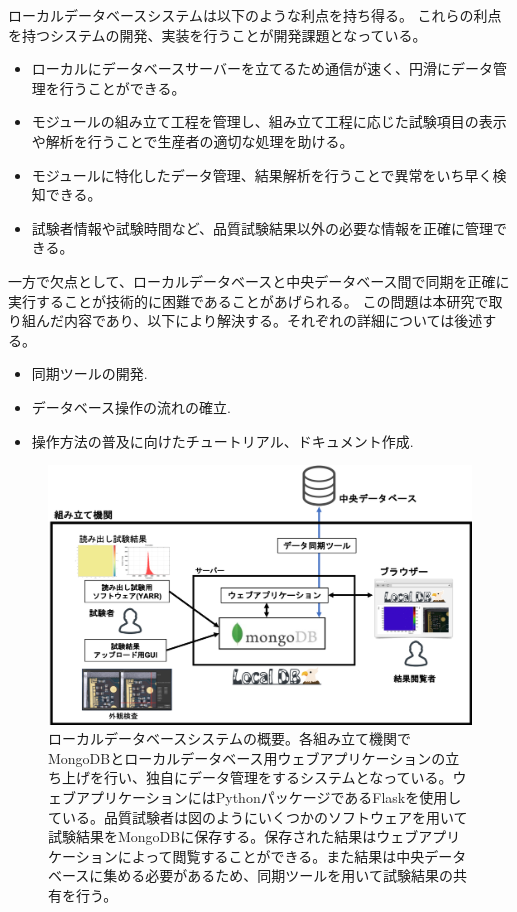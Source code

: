 ローカルデータベースシステムは以下のような利点を持ち得る。
これらの利点を持つシステムの開発、実装を行うことが開発課題となっている。

\begin{itemize}
  \item ローカルにデータベースサーバーを立てるため通信が速く、円滑にデータ管理を行うことができる。
  \item モジュールの組み立て工程を管理し、組み立て工程に応じた試験項目の表示や解析を行うことで生産者の適切な処理を助ける。
  \item モジュールに特化したデータ管理、結果解析を行うことで異常をいち早く検知できる。
  \item 試験者情報や試験時間など、品質試験結果以外の必要な情報を正確に管理できる。
\end{itemize}

一方で欠点として、ローカルデータベースと中央データベース間で同期を正確に実行することが技術的に困難であることがあげられる。
この問題は本研究で取り組んだ内容であり、以下により解決する。それぞれの詳細については後述する。
\begin{itemize}
  \item 同期ツールの開発.
  \item データベース操作の流れの確立.
  \item 操作方法の普及に向けたチュートリアル、ドキュメント作成.
\end{itemize}

\begin{figure}[bpt]\centering
\includegraphics[width=12cm]{./localdb_overview.png}
\caption[ローカルデータベースシステムの概要]{ローカルデータベースシステムの概要。各組み立て機関でMongoDBとローカルデータベース用ウェブアプリケーションの立ち上げを行い、独自にデータ管理をするシステムとなっている。ウェブアプリケーションにはPythonパッケージであるFlaskを使用している。品質試験者は図のようにいくつかのソフトウェアを用いて試験結果をMongoDBに保存する。保存された結果はウェブアプリケーションによって閲覧することができる。また結果は中央データベースに集める必要があるため、同期ツールを用いて試験結果の共有を行う。}
\label{localdb_overview}
\end{figure}

